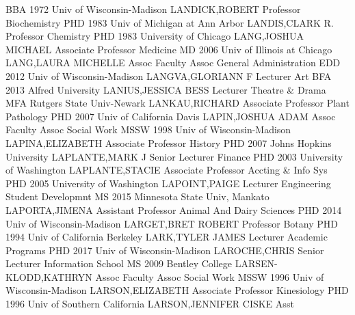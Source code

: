 \documentclass[
]{article}
\begin{document}
\textbar BBA 1972 Univ of Wisconsin-Madison \textbar LANDICK,ROBERT
\textbar Professor \textbar Biochemistry \textbar{} 
\textbar PHD 1983 Univ of Michigan at Ann Arbor \textbar LANDIS,CLARK R.
\textbar Professor \textbar Chemistry \textbar{} 
\textbar PHD 1983 University of Chicago \textbar LANG,JOSHUA MICHAEL
\textbar Associate Professor \textbar Medicine \textbar{} 
\textbar MD 2006 Univ of Illinois at Chicago \textbar LANG,LAURA
MICHELLE \textbar Assoc Faculty Assoc \textbar General Administration
\textbar{}  \textbar EDD 2012 Univ of Wisconsin-Madison
\textbar LANGVA,GLORIANN F \textbar Lecturer \textbar Art \textbar{}
 \textbar BFA 2013 Alfred University \textbar LANIUS,JESSICA
BESS \textbar Lecturer \textbar Theatre \& Drama \textbar{} 
\textbar MFA Rutgers State Univ-Newark \textbar LANKAU,RICHARD
\textbar Associate Professor \textbar Plant Pathology \textbar{}
 \textbar PHD 2007 Univ of California Davis
\textbar LAPIN,JOSHUA ADAM \textbar Assoc Faculty Assoc \textbar Social
Work \textbar{}  \textbar MSSW 1998 Univ of
Wisconsin-Madison \textbar LAPINA,ELIZABETH \textbar Associate Professor
\textbar History \textbar{}  \textbar PHD 2007 Johns Hopkins
University \textbar LAPLANTE,MARK J \textbar Senior Lecturer
\textbar Finance \textbar{}  \textbar PHD 2003 University of
Washington \textbar LAPLANTE,STACIE \textbar Associate Professor
\textbar Accting \& Info Sys \textbar{}  \textbar PHD 2005
University of Washington \textbar LAPOINT,PAIGE \textbar Lecturer
\textbar Engineering Student Developmnt \textbar{} 
\textbar MS 2015 Minnesota State Univ, Mankato \textbar LAPORTA,JIMENA
\textbar Assistant Professor \textbar Animal And Dairy Sciences
\textbar{}  \textbar PHD 2014 Univ of Wisconsin-Madison
\textbar LARGET,BRET ROBERT \textbar Professor \textbar Botany
\textbar{}  \textbar PHD 1994 Univ of California Berkeley
\textbar LARK,TYLER JAMES \textbar Lecturer \textbar Academic Programs
\textbar{}  \textbar PHD 2017 Univ of Wisconsin-Madison
\textbar LAROCHE,CHRIS \textbar Senior Lecturer \textbar Information
School \textbar{}  \textbar MS 2009 Bentley College
\textbar LARSEN-KLODD,KATHRYN \textbar Assoc Faculty Assoc
\textbar Social Work \textbar{}  \textbar MSSW 1996 Univ of
Wisconsin-Madison \textbar LARSON,ELIZABETH \textbar Associate Professor
\textbar Kinesiology \textbar{}  \textbar PHD 1996 Univ of
Southern California \textbar LARSON,JENNIFER CISKE \textbar Asst
\end{document}
